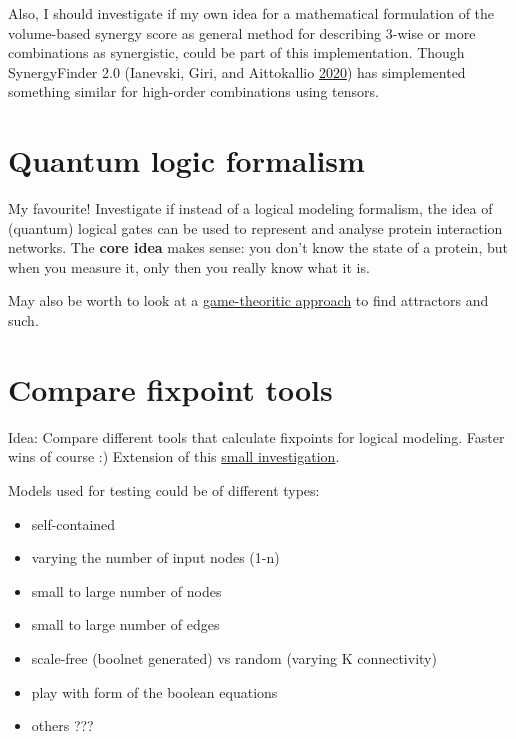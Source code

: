 \documentclass[
  12pt,
]{book}
\providecommand{\tightlist}{%
  \setlength{\itemsep}{0pt}\setlength{\parskip}{0pt}}
\begin{document}
Also, I should investigate if my own idea for a mathematical formulation of the volume-based synergy score as general method for describing 3-wise or more combinations as synergistic, could be part of this implementation.
Though SynergyFinder 2.0 (Ianevski, Giri, and Aittokallio \protect\hyperlink{ref-Ianevski2020}{2020}) has simplemented something similar for high-order combinations using tensors.

\hypertarget{quantum}{%
\section*{Quantum logic formalism}\label{quantum}}

My favourite! Investigate if instead of a logical modeling formalism, the idea
of (quantum) logical gates can be used to represent and analyse protein interaction
networks.
The \textbf{core idea} makes sense: you don't know the state of a protein, but when
you measure it, only then you really know what it is.

May also be worth to look at a \href{https://doi.org/10.1007/11885191_18}{game-theoritic approach}
to find attractors and such.

\hypertarget{comp}{%
\section*{Compare fixpoint tools}\label{comp}}

Idea: Compare different tools that calculate fixpoints for logical modeling.
Faster wins of course :) Extension of this \protect\hyperlink{attrToolCmp}{small investigation}.

Models used for testing could be of different types:

\begin{itemize}
\tightlist
\item
  self-contained
\item
  varying the number of input nodes (1-n)
\item
  small to large number of nodes
\item
  small to large number of edges
\item
  scale-free (boolnet generated) vs random (varying K connectivity)
\item
  play with form of the boolean equations
\item
  others ???
\end{itemize}
\end{document}
